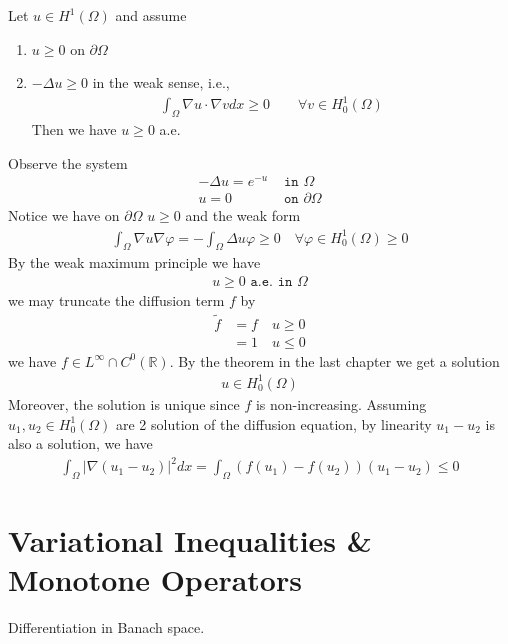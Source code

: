 \begin{proposition}
	Let $u \in H^1(\Omega)$ and assume
	\begin{enumerate}
		\item $u \ge 0$ on $\partial\Omega$
		\item $-\Delta u \ge 0$ in the weak sense, i.e., 
		\begin{align*}
			\int_\Omega \nabla u \cdot \nabla v dx \ge 0 \qquad \forall v \in H^1_0(\Omega)
		\end{align*}
		Then we have $u \ge 0$ a.e.
	\end{enumerate}
\end{proposition}

\begin{example}
Observe the system
\begin{align*}
	-\Delta u = e^{-u} &\texttt{ in } \Omega\\
	u = 0 &\texttt{ on } \partial \Omega
\end{align*}
Notice we have on $\partial\Omega$ $u \ge 0$ and the weak form 
\begin{align*}
	 \int_\Omega \nabla u \nabla \varphi = - \int_\Omega \Delta u \varphi  \ge 0 \quad \forall \varphi \in H^1_0(\Omega) \ge 0 
\end{align*}
By the weak maximum principle we have
\begin{align*}
	u \ge 0 \texttt{ a.e. in  } \Omega 
\end{align*}
we may truncate the diffusion term $f$ by
\begin{align*}
	\tilde{f} &= f \quad u \ge 0\\
	&= 1 \quad u \le 0 
\end{align*}
we have $f \in L^\infty \cap C^0(\mathbb{R})$. By the theorem in the last chapter we get a solution
\begin{align*}
	u \in H^1_0(\Omega)
\end{align*}
Moreover, the solution is unique since $f$ is non-increasing. Assuming $u_1, u_2 \in H^1_0(\Omega)$ are 2 solution of the diffusion equation, by linearity $u_1 - u_2$ is also a solution, we have
\begin{align*}
	\int_\Omega |\nabla(u_1 - u_2)|^2 dx = \int_\Omega (f(u_1) - f(u_2))(u_1 - u_2) \le 0 
\end{align*}
\end{example}





\section{Variational Inequalities \& Monotone Operators}
Differentiation in Banach space. 
